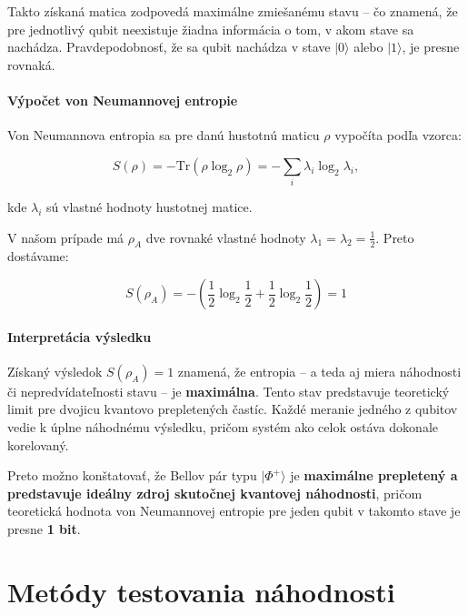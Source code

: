 Takto získaná matica zodpovedá maximálne zmiešanému stavu – čo znamená, že pre jednotlivý qubit neexistuje žiadna informácia o tom, v akom stave sa nachádza. Pravdepodobnosť, že sa qubit nachádza v stave $\lvert 0 \rangle$ alebo $\lvert 1 \rangle$, je presne rovnaká.

\paragraph{Výpočet von Neumannovej entropie}

Von Neumannova entropia sa pre danú hustotnú maticu $\rho$ vypočíta podľa vzorca:

\begin{equation}
  S(\rho) = -\mathrm{Tr}(\rho \log_2 \rho) = - \sum_i \lambda_i \log_2 \lambda_i,
  \label{eq:neaumab_entropy}
\end{equation}

kde $\lambda_i$ sú vlastné hodnoty hustotnej matice.

V našom prípade má $\rho_A$ dve rovnaké vlastné hodnoty $\lambda_1 = \lambda_2 = \frac{1}{2}$. Preto dostávame:

\begin{equation}
  S(\rho_A) = - \left( \frac{1}{2} \log_2 \frac{1}{2} + \frac{1}{2} \log_2 \frac{1}{2} \right) = 1
  \label{eq:neaumab_entropy_modified_to_fit}
\end{equation}

\paragraph{Interpretácia výsledku}

Získaný výsledok $S(\rho_A) = 1$ znamená, že entropia – a teda aj miera náhodnosti či nepredvídateľnosti stavu – je \textbf{maximálna}.
Tento stav predstavuje teoretický limit pre dvojicu kvantovo prepletených častíc. Každé meranie jedného z qubitov vedie k úplne náhodnému výsledku, pričom systém ako celok ostáva dokonale korelovaný.

Preto možno konštatovať, že Bellov pár typu $\lvert \Phi^+ \rangle$ je \textbf{maximálne prepletený a predstavuje ideálny zdroj skutočnej kvantovej náhodnosti}, pričom teoretická hodnota von Neumannovej entropie pre jeden qubit v takomto stave je presne \textbf{1 bit}.

\section{Metódy testovania náhodnosti}\label{sec:statisticke-testy-nahodnosti}

